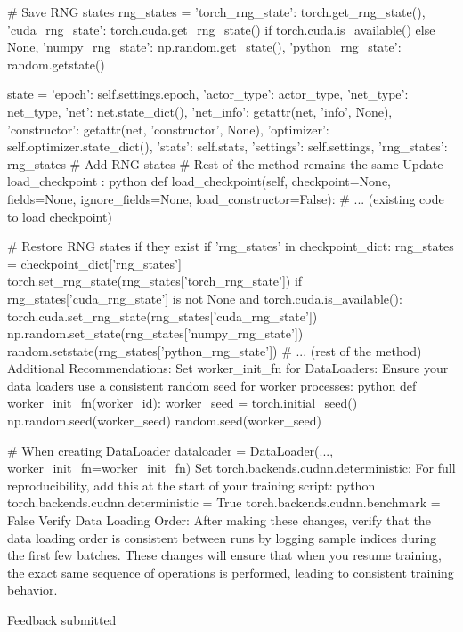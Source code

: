    # Save RNG states
    rng_states = {
        'torch_rng_state': torch.get_rng_state(),
        'cuda_rng_state': torch.cuda.get_rng_state() if torch.cuda.is_available() else None,
        'numpy_rng_state': np.random.get_state(),
        'python_rng_state': random.getstate()
    }
    
    state = {
        'epoch': self.settings.epoch,
        'actor_type': actor_type,
        'net_type': net_type,
        'net': net.state_dict(),
        'net_info': getattr(net, 'info', None),
        'constructor': getattr(net, 'constructor', None),
        'optimizer': self.optimizer.state_dict(),
        'stats': self.stats,
        'settings': self.settings,
        'rng_states': rng_states  # Add RNG states
    }
    # Rest of the method remains the same
Update 
load_checkpoint
:
python
def load_checkpoint(self, checkpoint=None, fields=None, ignore_fields=None, load_constructor=False):
    # ... (existing code to load checkpoint)
    
    # Restore RNG states if they exist
    if 'rng_states' in checkpoint_dict:
        rng_states = checkpoint_dict['rng_states']
        torch.set_rng_state(rng_states['torch_rng_state'])
        if rng_states['cuda_rng_state'] is not None and torch.cuda.is_available():
            torch.cuda.set_rng_state(rng_states['cuda_rng_state'])
        np.random.set_state(rng_states['numpy_rng_state'])
        random.setstate(rng_states['python_rng_state'])
    # ... (rest of the method)
Additional Recommendations:
Set worker_init_fn for DataLoaders: Ensure your data loaders use a consistent random seed for worker processes:
python
def worker_init_fn(worker_id):
    worker_seed = torch.initial_seed() %
    np.random.seed(worker_seed)
    random.seed(worker_seed)

# When creating DataLoader
dataloader = DataLoader(..., worker_init_fn=worker_init_fn)
Set torch.backends.cudnn.deterministic: For full reproducibility, add this at the start of your training script:
python
torch.backends.cudnn.deterministic = True
torch.backends.cudnn.benchmark = False
Verify Data Loading Order: After making these changes, verify that the data loading order is consistent between runs by logging sample indices during the first few batches.
These changes will ensure that when you resume training, the exact same sequence of operations is performed, leading to consistent training behavior.

Feedback submitted